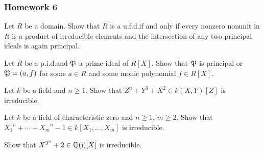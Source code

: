 \subsubsection{Homework 6}
\setcounter{exercise}{0}
\setcounter{equation}{0}

\begin{problem}
  Let \(R\) be a domain. Show that \(R\) is a u.f.d.\@ if and only if every
  nonzero nonunit in \(R\) is a product of irreducible elements and the
  intersection of any two principal ideals is again principal.
\end{problem}
\begin{solution}
\end{solution}

\begin{problem}
  Let \(R\) be a p.i.d.\@ and \(\mathfrak{P}\) a prime ideal of \(R[X]\). Show
  that \(\mathfrak{P}\) is principal or \(\mathfrak{P}=(a,f)\) for some \(a\in R\) and
  some monic polynomial \(f\in R[X]\).
\end{problem}
\begin{solution}
\end{solution}

\begin{problem}
  Let \(k\) be a field and \(n\geq 1\). Show that
  \(Z^n+Y^3+X^2\in k(X,Y)[Z]\) is irreducible.
\end{problem}
\begin{solution}
\end{solution}

\begin{problem}
  Let \(k\) be a field of characteristic zero and \(n\geq 1\), \(m\geq
  2\). Show that \({X_1}^n+\dotsb+{X_m}^n-1\in k[X_1,\dotsc,X_m]\) is
  irreducible.
\end{problem}
\begin{solution}
\end{solution}

\begin{problem}
  Show that \(X^{3^n}+2\in\mathbb{Q}(\mathrm{i})[X]\) is irreducible.
\end{problem}
\begin{solution}
\end{solution}

